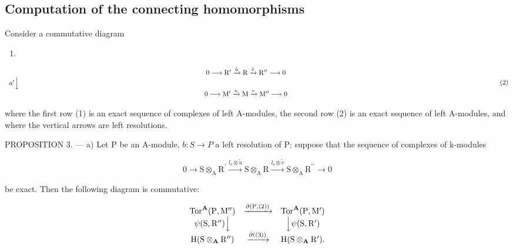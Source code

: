 \subsection{Computation of the connecting homomorphisms}

Consider a commutative diagram

\begin{enumerate}
\def\labelenumi{(\arabic{enumi})}
\tightlist
\item
\end{enumerate}

\[
\begin{array}{c} 0 \longrightarrow \mathrm{R} ^ {\prime} \xrightarrow {\tilde {u}} \mathrm{R} \xrightarrow {\tilde {v}} \mathrm{R} ^ {\prime \prime} \longrightarrow 0 \\ a ^ {\prime} \Big \downarrow \qquad \qquad \qquad \qquad \qquad \qquad \qquad \qquad \qquad \qquad \qquad \qquad \qquad \qquad \qquad \qquad \qquad \qquad \qquad \qquad \qquad \qquad \qquad \qquad \qquad \qquad \qquad \qquad \qquad \qquad \qquad \qquad \qquad \qquad \\ 0 \longrightarrow \mathrm{M} ^ {\prime} \xrightarrow {u} \mathrm{M} \xrightarrow {v} \mathrm{M} ^ {\prime \prime} \longrightarrow 0 \end{array}\tag{2}
\]

where the first row (1) is an exact sequence of complexes of left A-modules, the second row (2) is an exact sequence of left A-modules, and where the vertical arrows are left resolutions.

PROPOSITION 3. --- a) Let P be an A-module, \(b: S \to P\) a left resolution of P; suppose that the sequence of complexes of k-modules

\[
0 \rightarrow \mathrm{S} \otimes_ {\mathrm{A}} \mathrm{R} ^ {\prime} \xrightarrow {l _ {\mathrm{s}} \otimes \tilde {u}} \mathrm{S} \otimes_ {\mathrm{A}} \mathrm{R} \xrightarrow {l _ {\mathrm{s}} \otimes \tilde {v}} \mathrm{S} \otimes_ {\mathrm{A}} \mathrm{R} ^ {\prime \prime} \rightarrow 0\tag{3}
\]

be exact. Then the following diagram is commutative:

\[
\begin{array}{c c c} \operatorname{Tor} ^ {\mathbf {A}} (\mathrm{P}, \mathrm{M} ^ {\prime \prime}) & \xrightarrow {\partial (\mathrm{P} , (2))} & \operatorname{Tor} ^ {\mathbf {A}} (\mathrm{P}, \mathrm{M} ^ {\prime}) \\ \psi (\mathrm{S}, \mathrm{R} ^ {\prime \prime}) \Big \downarrow & & \Big \downarrow \psi (\mathrm{S}, \mathrm{R} ^ {\prime}) \\ \mathrm{H} (\mathrm{S} \otimes_ {\mathbf {A}} \mathrm{R} ^ {\prime \prime}) & \xrightarrow {\partial ((3))} & \mathrm{H} (\mathrm{S} \otimes_ {\mathbf {A}} \mathrm{R} ^ {\prime}). \end{array}
\]

